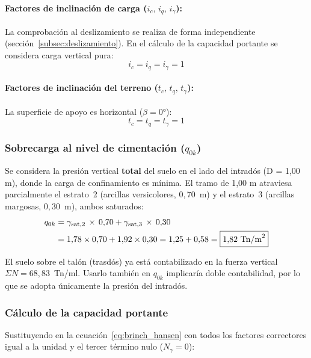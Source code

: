 \paragraph{Factores de inclinación de carga ($i_c,\, i_q,\, i_\gamma$):}
La comprobación al deslizamiento se realiza de forma independiente
(sección~\ref{subsec:deslizamiento}). En el cálculo de la capacidad portante se
considera carga vertical pura:
\[
  i_c = i_q = i_\gamma = 1
\]

\paragraph{Factores de inclinación del terreno ($t_c,\, t_q,\, t_\gamma$):}
La superficie de apoyo es horizontal ($\beta = 0°$):
\[
  t_c = t_q = t_\gamma = 1
\]

\subsubsection{Sobrecarga al nivel de cimentación ($q_{0k}$)}

Se considera la presión vertical \textbf{total} del suelo en el lado del intradós
(D = 1,00 m), donde la carga de confinamiento es mínima. El tramo de 1,00 m
atraviesa parcialmente el estrato~2 (arcillas versicolores, $0{,}70$~m) y el
estrato~3 (arcillas margosas, $0{,}30$~m), ambos saturados:
\begin{align*}
  q_{0k} &= \gamma_{\text{sat},2}\,\times\,0{,}70
           + \gamma_{\text{sat},3}\,\times\,0{,}30 \\
         &= 1{,}78 \times 0{,}70 + 1{,}92 \times 0{,}30
          = 1{,}25 + 0{,}58 = \boxed{1{,}82~\text{Tn/m}^2}
\end{align*}

\begin{notabox}
  El suelo sobre el talón (trasdós) ya está contabilizado en la fuerza vertical
  $\Sigma N = 68{,}83$~Tn/ml. Usarlo también en $q_{0k}$ implicaría doble
  contabilidad, por lo que se adopta únicamente la presión del intradós.
\end{notabox}

\subsubsection{Cálculo de la capacidad portante}

Sustituyendo en la ecuación~\eqref{eq:brinch_hansen} con todos los factores
correctores igual a la unidad y el tercer término nulo ($N_\gamma = 0$):

